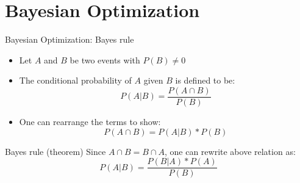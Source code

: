 \section{Bayesian Optimization}
\begin{frame}[c]{Bayesian Optimization: Bayes rule}

\begin{itemize}
    \item Let $A$ and $B$ be two events with $P(B) \neq 0$ \pause
    \item The conditional probability of $A$ given $B$ is defined to be:
	\begin{equation*}
	    P(A \vert B) = \frac{P(A \cap B)}{P(B)}
    \label{eq:cond_prob}  
	\end{equation*} \pause
	\item One can rearrange the terms to show:
        \begin{equation*}
            P(A \cap B) = P(A \vert B) * P(B)
        \end{equation*} \pause
\end{itemize}

\begin{center}
\begin{minipage}{0.75\textwidth}
\begin{block}{Bayes rule (theorem)}
Since $A \cap B = B \cap A$, one can rewrite above relation as:
	\begin{equation*}
	    P(A \vert B) = \frac{P(B \vert A) * P(A)}{P(B)}
        \label{eq:bayes_rule}  
	\end{equation*}
\end{block}
\end{minipage}
\end{center}

\end{frame}

